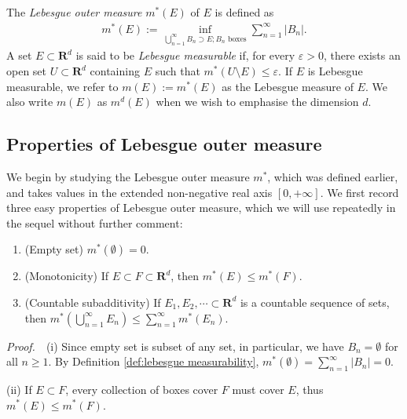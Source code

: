 \documentclass{book}
\theoremstyle{defstyle}
\theoremstyle{thmstyle}
\newcommand{\pff}{\noindent\emph{Proof.}~~}
\begin{document}
\begin{definition}\label{def:lebesgue measurability}
    The \emph{Lebesgue outer measure} $m^*(E)$ of $E$ is defined as
        \begin{align*}
            m^*(E) := \inf_{\bigcup_{n = 1}^{\infty} B_n \supset E; B_n \text{ boxes}}\sum_{n = 1}^{\infty}|B_n|.
        \end{align*}
    A set $E \subset \mathbf{R}^d$ is said to be \emph{Lebesgue measurable} if, for every $\varepsilon > 0$, there exists an open set $U \subset \mathbf{R}^d$ containing $E$ such that $m^*(U \setminus E) \leq \varepsilon$. If $E$ is Lebesgue measurable, we refer to $m(E) := m^*(E)$ as the Lebesgue measure of $E$. We also write $m(E)$ as $m^d(E)$ when we wish to emphasise the dimension $d$.
\end{definition}



\subsection{Properties of Lebesgue outer measure} 

We begin by studying the Lebesgue outer measure $m^*$, which was defined earlier, and takes values in the extended non-negative real axis $[0, +\infty]$. We first record three easy properties of Lebesgue outer measure, which we will use repeatedly in the sequel without further comment:

\begin{proposition}\label{thm:the outer measure axioms}
    \quad
    \begin{enumerate}
        \item (Empty set) $m^*(\emptyset) = 0$.
        \item (Monotonicity) If $E \subset F \subset \mathbf{R}^d$, then $m^*(E) \leq m^*(F)$.
        \item (Countable subadditivity) If $E_1, E_2, \cdots \subset \mathbf{R}^d$ is a countable sequence of sets, then $m^*(\bigcup_{n = 1}^{\infty}E_n) \leq \sum_{n = 1}^{\infty}m^*(E_n)$.
    \end{enumerate}
\end{proposition}

\pff (i) Since empty set is subset of any set, in particular, we have $B_n = \emptyset$ for all $n \geq 1$. By Definition \ref{def:lebesgue measurability}, $m^*(\emptyset) = \sum_{n = 1}^{\infty}|B_n| = 0$.

(ii) If $E \subset F$, every collection of boxes cover $F$ must cover $E$, thus $m^*(E) \leq m^*(F)$.
\end{document}

